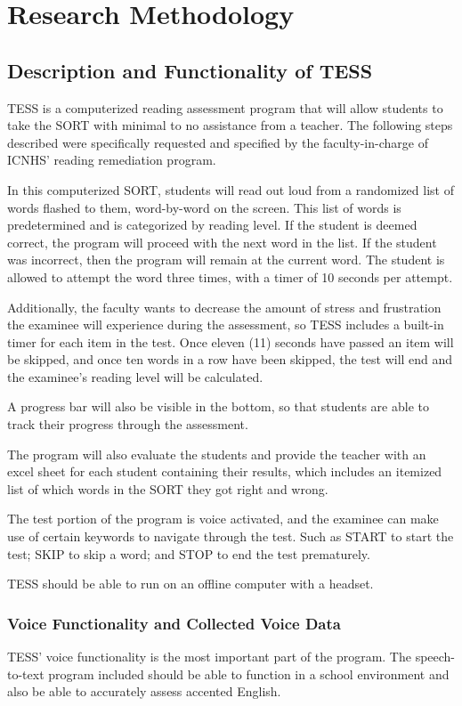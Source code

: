 \chapter{Research Methodology}

\section{Description and Functionality of TESS}
TESS is a computerized reading assessment program that will allow students to take the SORT with minimal to no assistance from a teacher. The following steps described were specifically requested and specified by the faculty-in-charge of ICNHS' reading remediation program.

In this computerized SORT, students will read out loud from a randomized list of words flashed to them, word-by-word on the screen. This list of words is predetermined and is categorized by reading level. If the student is deemed correct, the program will proceed with the next word in the list. If the student was incorrect, then the program will remain at the current word. The student is allowed to attempt the word three times, with a timer of 10 seconds per attempt.

Additionally, the faculty wants to decrease the amount of stress and frustration the examinee will experience during the assessment, so TESS includes a built-in timer for each item in the test. Once eleven (11) seconds have passed an item will be skipped, and once ten words in a row have been skipped, the test will end and the examinee’s reading level will be calculated.

A progress bar will also be visible in the bottom, so that students are able to track their progress through the assessment.

The program will also evaluate the students and provide the teacher with an excel sheet for each student containing their results, which includes an itemized list of which words in the SORT they got right and wrong.

The test portion of the program is voice activated, and the examinee can make use of certain keywords to navigate through the test. Such as START to start the test; SKIP to skip a word; and STOP to end the test prematurely.

TESS should be able to run on an offline computer with a headset.

\subsection{Voice Functionality and Collected Voice Data}
TESS’ voice functionality is the most important part of the program. The speech-to-text program included should be able to function in a school environment and also be able to accurately assess accented English.

